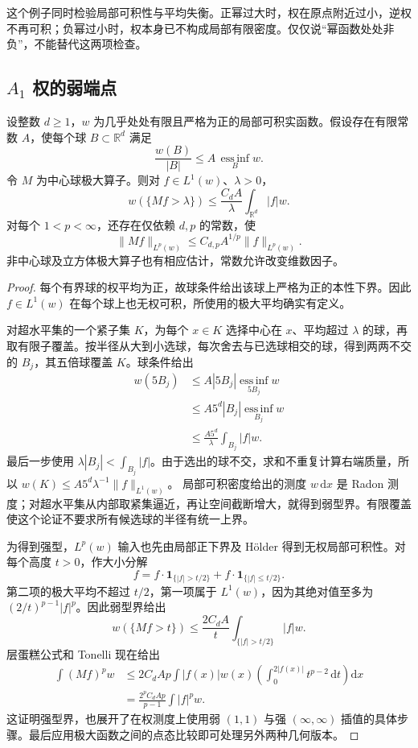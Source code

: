 这个例子同时检验局部可积性与平均失衡。正幂过大时，权在原点附近过小，逆权不再可积；负幂过小时，权本身已不构成局部有限密度。仅仅说“幂函数处处非负”，不能替代这两项检查。

\subsection{\texorpdfstring{\(A_1\)}{A₁} 权的弱端点}
\label{b2:subsec:C-a1-endpoint}

\begin{proposition}[\(A_1\) 加权极大函数界]
\label{b2:prop:C-a1-maximal}
设整数 \(d\geq1\)，\(w\) 为几乎处处有限且严格为正的局部可积实函数。假设存在有限常数 \(A\)，使每个球 \(B\subset\mathbb R^d\) 满足
\[
 \frac{w(B)}{|B|}
       \leq A\,\operatorname*{ess\,inf}_Bw.
\]
令 \(M\) 为中心球极大算子。则对 \(f\in L^1(w)\)、\(\lambda>0\)，
\[
 w(\{Mf>\lambda\})
       \leq\frac{C_dA}{\lambda}\int_{\mathbb R^d}|f|w.
\]
对每个 \(1<p<\infty\)，还存在仅依赖 \(d,p\) 的常数，使
\[
 \|Mf\|_{L^p(w)}
       \leq C_{d,p}A^{1/p}\|f\|_{L^p(w)}.
\]
非中心球及立方体极大算子也有相应估计，常数允许改变维数因子。
\end{proposition}
\begin{proof}
每个有界球的权平均为正，故球条件给出该球上严格为正的本性下界。因此 \(f\in L^1(w)\) 在每个球上也无权可积，所使用的极大平均确实有定义。

对超水平集的一个紧子集 \(K\)，为每个 \(x\in K\) 选择中心在 \(x\)、平均超过 \(\lambda\) 的球，再取有限子覆盖。按半径从大到小选球，每次舍去与已选球相交的球，得到两两不交的 \(B_j\)，其五倍球覆盖 \(K\)。球条件给出
\[
 \begin{aligned}
 w(5B_j)
 &\leq A|5B_j|\operatorname*{ess\,inf}_{5B_j}w\\
 &\leq A5^d|B_j|\operatorname*{ess\,inf}_{B_j}w\\
 &\leq\frac{A5^d}{\lambda}
       \int_{B_j}|f|w.
 \end{aligned}
\]
最后一步使用 \(\lambda|B_j|<\int_{B_j}|f|\)。由于选出的球不交，求和不重复计算右端质量，所以
\(w(K)\leq A5^d\lambda^{-1}\|f\|_{L^1(w)}\)。
局部可积密度给出的测度 \(w\,\mathrm dx\) 是 Radon 测度；对超水平集从内部取紧集逼近，再让空间截断增大，就得到弱型界。有限覆盖使这个论证不要求所有候选球的半径有统一上界。

为得到强型，\(L^p(w)\) 输入也先由局部正下界及 Hölder 得到无权局部可积性。对每个高度 \(t>0\)，作大小分解
\[
 f=f\cdot\mathbf1_{\{|f|>t/2\}}
       +f\cdot\mathbf1_{\{|f|\leq t/2\}}.
\]
第二项的极大平均不超过 \(t/2\)，第一项属于 \(L^1(w)\)，因为其绝对值至多为
\((2/t)^{p-1}|f|^p\)。因此弱型界给出
\[
 w(\{Mf>t\})
       \leq\frac{2C_dA}{t}
            \int_{\{|f|>t/2\}}|f|w.
\]
层蛋糕公式和 Tonelli 现在给出
\[
 \begin{aligned}
 \int(Mf)^pw
 &\leq2C_dAp\int |f(x)|w(x)
       \left(\int_0^{2|f(x)|}t^{p-2}\,\mathrm dt\right)\mathrm dx\\
 &=\frac{2^pC_dAp}{p-1}\int|f|^pw.
 \end{aligned}
\]
这证明强型界，也展开了在权测度上使用弱 \((1,1)\) 与强
\((\infty,\infty)\) 插值的具体步骤。最后应用极大函数之间的点态比较即可处理另外两种几何版本。
\end{proof}

